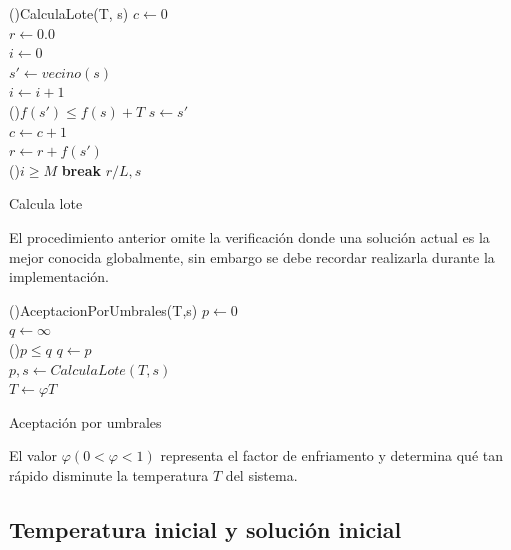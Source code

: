 \documentclass[12pt, letterpaper]{article}
\begin{document}
\begin{algorithm}[H]
\Fn(){CalculaLote(T, s)}{
    $c \gets 0$\\
    $r \gets 0.0$\\
    $i \gets 0$\\
     {
        $s' \gets vecino(s)$\\
        $i \gets i+1$\\
        \If(){$f(s') \leq f(s) + T$}{
            $s \gets s'$\\
            $c \gets c+1$\\
            $r \gets r+f(s')$\\
        }
        \If(){$i \geq M$}{
            \textbf{break}
        }
    }
    \Return $r/L,s$
}
\caption{Calcula lote}
\label{proc:2}
\end{algorithm}
\bigskip
\par
El procedimiento anterior omite la verificación donde una solución actual es la mejor conocida globalmente, sin embargo se debe recordar realizarla durante la implementación.
\bigskip

\begin{algorithm}[H]
\Fn(){AceptacionPorUmbrales(T,s)}{
    $p \gets 0$\\
     {
        $q \gets \infty$\\
        \While(){$p \leq q$}{
            $q \gets p$\\
            $p,s \gets CalculaLote(T,s)$\\
        }
        $T \gets \varphi T$
    }
}
\caption{Aceptación por umbrales}
\label{proc:3}
\end{algorithm}
\bigskip

\par
El valor $\varphi (0 < \varphi < 1)$ representa el factor de enfriamento y determina qué tan rápido disminute la temperatura $T$ del sistema.

\subsection{Temperatura inicial y solución inicial}
\label{sub:2}
\end{document}
